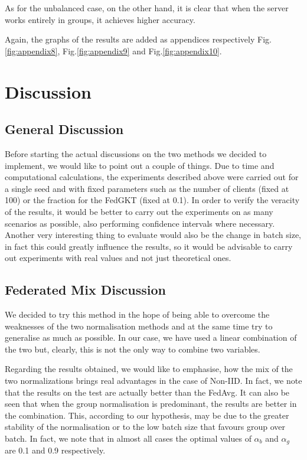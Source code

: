\documentclass[conference]{IEEEtran}
\begin{document}
As for the unbalanced case, on the other hand, it is clear that when the server works entirely in groups, it achieves higher accuracy.

Again, the graphs of the results are added as appendices respectively Fig.\ref{fig:appendix8}, Fig.\ref{fig:appendix9} and Fig.\ref{fig:appendix10}.

\section{Discussion}

\subsection{General Discussion}
Before starting the actual discussions on the two methods we decided to implement, we would like to point out a couple of things. Due to time and computational calculations, the experiments described above were carried out for a single seed and with fixed parameters such as the number of clients (fixed at 100) or the fraction for the FedGKT (fixed at 0.1). In order to verify the veracity of the results, it would be better to carry out the experiments on as many scenarios as possible, also performing confidence intervals where necessary. Another very interesting thing to evaluate would also be the change in batch size, in fact this could greatly influence the results, so it would be advisable to carry out experiments with real values and not just theoretical ones.

\subsection{Federated Mix Discussion}
We decided to try this method in the hope of being able to overcome the weaknesses of the two normalisation methods and at the same time try to generalise as much as possible. In our case, we have used a linear combination of the two but, clearly, this is not the only way to combine two variables. 

Regarding the results obtained, we would like to emphasise, how the mix of the two normalizations brings real advantages in the case of Non-IID. In fact, we note that the results on the test are actually better than the FedAvg. It can also be seen that when the group normalisation is predominant, the results are better in the combination. This, according to our hypothesis, may be due to the greater stability of the normalisation or to the low batch size that favours group over batch. In fact, we note that in almost all cases the optimal values of $\alpha_b$ and $\alpha_g$ are 0.1 and 0.9 respectively.
\end{document}
